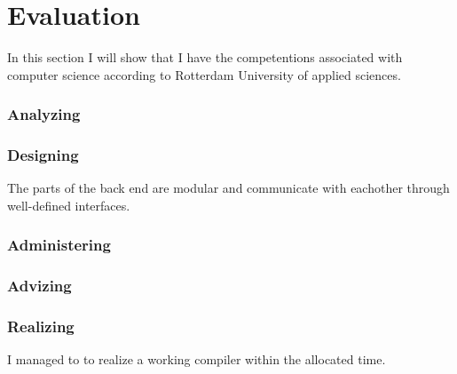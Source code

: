 \section{Evaluation}\label{evaluation}
In this section I will show that I have the competentions associated with computer science according to Rotterdam University of applied sciences.

\subsubsection{Analyzing}


\subsubsection{Designing}
The parts of the back end are modular and communicate with eachother through well-defined interfaces.

\subsubsection{Administering}

\subsubsection{Advizing}

\subsubsection{Realizing}
I managed to to realize a working compiler within the allocated time.
